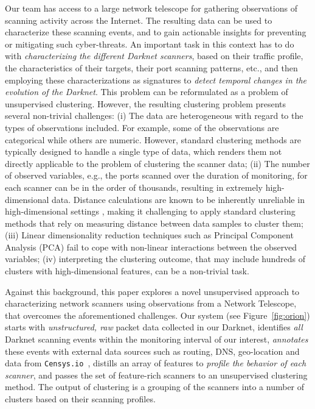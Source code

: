 \documentclass[manuscript, nonacm]{acmart}
\begin{document}
Our team has access to a large network telescope for gathering observations of  
scanning activity across the Internet. The resulting data can be used to characterize these 
scanning events, and to gain actionable insights for preventing or mitigating such cyber-threats. 
An important task in this context has to do with \emph{characterizing the different 
Darknet scanners},
based on their traffic profile, the characteristics of their targets, 
their port scanning patterns, etc., and then employing these
characterizations as signatures to \emph{detect temporal changes
in the evolution of the Darknet}.
This problem can be reformulated as a problem of 
unsupervised clustering. However, the resulting clustering problem presents several
non-trivial challenges: (i) The data are heterogeneous with regard to the types of observations included. 
For example, some of the observations are categorical while others are numeric. However, 
standard clustering methods are typically designed to handle a single type of data, which 
renders them not directly applicable to the problem of clustering the scanner data; 
(ii) The number of observed variables, e.g., the  ports scanned over the duration of monitoring,  for each scanner can be in the order of thousands, 
resulting in extremely high-dimensional data.  Distance calculations are known to be inherently
unreliable in high-dimensional settings \cite{aggarwal2001surprising}, making it challenging to apply 
standard clustering methods that rely on measuring distance between data samples to cluster 
them; (iii) Linear dimensionality reduction techniques  such
as Principal Component Analysis (PCA) \cite{jolliffe2016principal} fail to cope with non-linear 
interactions between the observed variables;
(iv) interpreting the clustering outcome, that may include
hundreds of clusters with high-dimensional features, can be a non-trivial task.  

Against this background, this paper explores a novel unsupervised approach to characterizing 
network scanners using observations from a Network Telescope, that overcomes the aforementioned 
challenges. Our system (see Figure~\ref{fig:orion})
starts with \emph{unstructured, raw} packet data collected in our Darknet,
identifies \emph{all} Darknet scanning events within the monitoring interval of our interest,
\emph{annotates} these events with external data sources such as routing, DNS, geo-location
and data from \texttt{Censys.io}~\cite{censys}, distills an array of features to \emph{profile the behavior of each scanner},
and passes the set of feature-rich scanners to an unsupervised clustering method. The output of clustering is a grouping of the scanners into a number of clusters based on their scanning profiles. 
\end{document}
